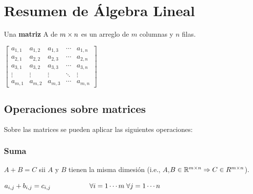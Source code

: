 \documentclass[]{article}
\begin{document}
\begin{titlepage}


\vfill %

\end{titlepage}



\thispagestyle{fancy}

\tableofcontents

\newpage

\section{Resumen de Álgebra Lineal}
\begin{defi}
	Una \textbf{matriz} A de $m \times n$ es un arreglo de $m$ columnas y $n$ filas. \\
	\begin{center}
		$\begin{bmatrix}
			a_{1,1} & a_{1,2} & a_{1,3} & \cdots & a_{1,n} \\
			a_{2,1} & a_{2,2} & a_{2,3} & \cdots & a_{2,n} \\
			a_{3,1} & a_{3,2} & a_{3,3} & \cdots & a_{3,n} \\
			\vdots & \vdots & \vdots & \ddots & \vdots \\
			a_{m,1} & a_{m,2} & a_{m,3} & \cdots & a_{m,n}
		\end{bmatrix}$
	\end{center}
\end{defi}

\subsection{Operaciones sobre matrices}
Sobre las matrices se pueden aplicar las siguientes operaciones:

\subsubsection{Suma}
$A + B = C$ sii $A$ y $B$ tienen la misma dimesión (i.e., $A$,$B \in \mathbb{R}^{m\times n} \Rightarrow C \in R^{m\times n}$).
	\begin{center}
		$a_{i,j} + b_{i,j} = c_{i,j} \hspace{2cm} \forall i=1\cdots m \; \forall j = 1\cdots n$
	\end{center}
\end{document}

